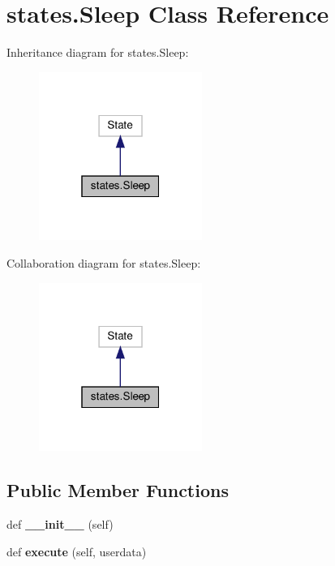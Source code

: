 \hypertarget{classstates_1_1Sleep}{}\section{states.\+Sleep Class Reference}
\label{classstates_1_1Sleep}


Inheritance diagram for states.\+Sleep\+:
\nopagebreak
\begin{figure}[H]
\begin{center}
\leavevmode
\includegraphics[width=151pt]{classstates_1_1Sleep__inherit__graph}
\end{center}
\end{figure}


Collaboration diagram for states.\+Sleep\+:
\nopagebreak
\begin{figure}[H]
\begin{center}
\leavevmode
\includegraphics[width=151pt]{classstates_1_1Sleep__coll__graph}
\end{center}
\end{figure}
\subsection*{Public Member Functions}
\begin{DoxyCompactItemize}
\item 
\mbox{\label{classstates_1_1Sleep_a9ba0b1f24b16271bd4fb61a0132ff986}} 
def {\bfseries \+\_\+\+\_\+init\+\_\+\+\_\+} (self)
\item 
\mbox{\label{classstates_1_1Sleep_a61c88767aa459b13a751cd41204925d4}} 
def {\bfseries execute} (self, userdata)
\end{DoxyCompactItemize}


